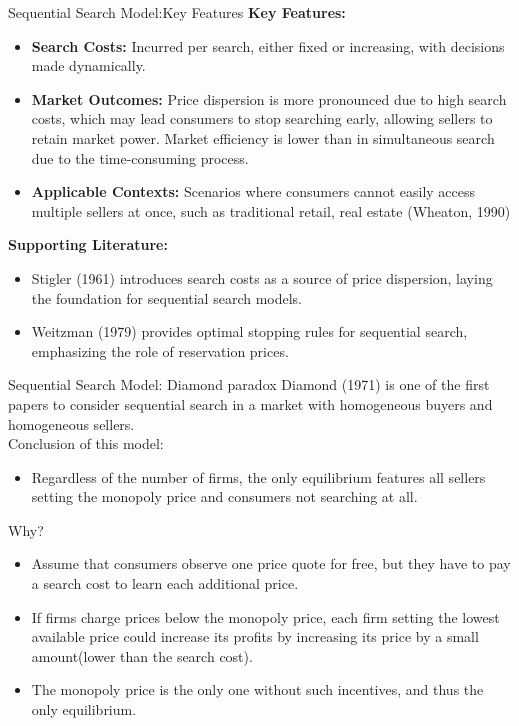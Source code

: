 \documentclass[aspectratio=169]{beamer}  %
\begin{document}
\begin{frame}{Sequential Search Model:Key Features}
    \textbf{Key Features:}
    \begin{itemize}
        \item \textbf{Search Costs:} Incurred per search, either fixed or increasing, with decisions made dynamically.
        \item \textbf{Market Outcomes:} Price dispersion is more pronounced due to high search costs, which may lead consumers to stop searching early, allowing sellers to retain market power. Market efficiency is lower than in simultaneous search due to the time-consuming process.
        \item \textbf{Applicable Contexts:} Scenarios where consumers cannot easily access multiple sellers at once, such as traditional retail, real estate (Wheaton, 1990)
    \end{itemize}
    \textbf{Supporting Literature:}
    \begin{itemize}
        \item Stigler (1961) introduces search costs as a source of price dispersion, laying the foundation for sequential search models.
        \item Weitzman (1979) provides optimal stopping rules for sequential search, emphasizing the role of reservation prices.
    \end{itemize}
\end{frame}

\begin{frame}{Sequential Search Model: Diamond paradox }
    Diamond (1971) is one of the first papers to consider sequential search in a market with homogeneous buyers and homogeneous sellers.\\
    Conclusion of this model:
    \begin{itemize}
        \item Regardless of the number of firms, the only equilibrium features all sellers setting the monopoly price and consumers not searching at all.
    \end{itemize}
    Why?
    \begin{itemize}
        \item Assume that consumers observe one price quote for free, but they have to pay a search cost to learn each additional price.
        \item If firms charge prices below the monopoly price, each firm setting the lowest available price could increase its profits by increasing its price by a small amount(lower than the search cost).
        \item The monopoly price is the only one without such incentives, and thus the only equilibrium.
    \end{itemize}
\end{frame}
\end{document}
